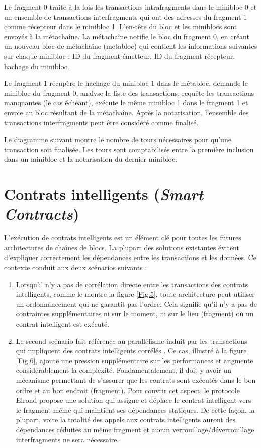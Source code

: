 \documentclass[journal]{IEEEtran}
\begin{document}
Le fragment 0 traite à la fois les transactions intrafragments dans le minibloc 0 et un ensemble de transactions interfragments qui ont des adresses du fragment 1 comme récepteur dans le minibloc 1. L'en-tête du bloc et les miniblocs sont envoyés à la métachaîne. La métachaîne notifie le bloc du fragment 0, en créant un nouveau bloc de métachaîne (metabloc) qui contient les informations suivantes sur chaque minibloc : ID du fragment émetteur, ID du fragment récepteur, hachage du minibloc.

Le fragment 1 récupère le hachage du minibloc 1 dans le métabloc, demande le minibloc du fragment 0, analyse la liste des transactions, requête les transactions manquantes (le cas échéant), exécute le même minibloc 1 dans le fragment 1 et envoie au bloc résultant de la métachaîne. Après la notarisation, l'ensemble des transactions interfragments peut être considéré comme finalisé.

Le diagramme suivant montre le nombre de tours nécessaires pour qu'une transaction soit finalisée. Les tours sont comptabilisés entre la première inclusion dans un minibloc et la notarisation du dernier minibloc.

\section{Contrats intelligents (\textit{Smart Contracts}) }
L'exécution de contrats intelligents est un élément clé pour toutes les futures architectures de chaînes de blocs. La plupart des solutions existantes évitent d’expliquer correctement les dépendances entre les transactions et les données. Ce contexte conduit aux deux scénarios suivants :

\begin{enumerate}
  \item Lorsqu'il n'y a pas de corrélation directe entre les transactions des contrats intelligents, comme le montre la figure \ref{Fig.5}, toute architecture peut utiliser un ordonnancement qui ne garantit pas l'ordre. Cela signifie qu'il n'y a pas de contraintes supplémentaires ni sur le moment, ni sur le lieu (fragment) où un contrat intelligent est exécuté.
  \item  Le second scénario fait référence au parallélisme induit par les transactions qui impliquent des contrats intelligents corrélés \cite{37}. Ce cas, illustré à la figure \ref{Fig.6}, ajoute une pression supplémentaire sur les performances et augmente considérablement la complexité. Fondamentalement, il doit y avoir un mécanisme permettant de s'assurer que les contrats sont exécutés dans le bon ordre et au bon endroit (fragment). Pour couvrir cet aspect, le protocole Elrond propose une solution qui assigne et déplace le contrat intelligent vers le fragment même qui maintient ses dépendances statiques. De cette façon, la plupart, voire la totalité des appels aux contrats intelligents auront des dépendances réduites au même fragment  et aucun verrouillage/déverrouillage interfragments ne sera nécessaire.
\end{enumerate}  
\end{document}
